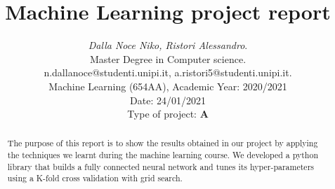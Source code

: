 \documentclass[12pt, letterpaper]{article}  %
\title{\vspace{-2cm}\textbf{Machine Learning project report}}
\author{\small{\textit{Dalla Noce Niko, Ristori Alessandro}.} \\ %
        \small{Master Degree in Computer science.}\\ \small{{n.dallanoce@studenti.unipi.it, a.ristori5@studenti.unipi.it}.} \\  %
        \small{Machine Learning (654AA), Academic Year: 2020/2021} \\
        \small{Date: 24/01/2021} \\
        \small{Type of project: \textbf{A}}
}
\begin{document}
\nocite{*}  %
\date{}
\maketitle
\begin{abstract}
The purpose of this report is to show the results obtained in our project by applying the techniques we learnt during the machine learning course. We developed a python library that builds a fully connected neural network and tunes its hyper-parameters using a K-fold cross validation with grid search.
\end{abstract}
%
\newpage





\end{document}
